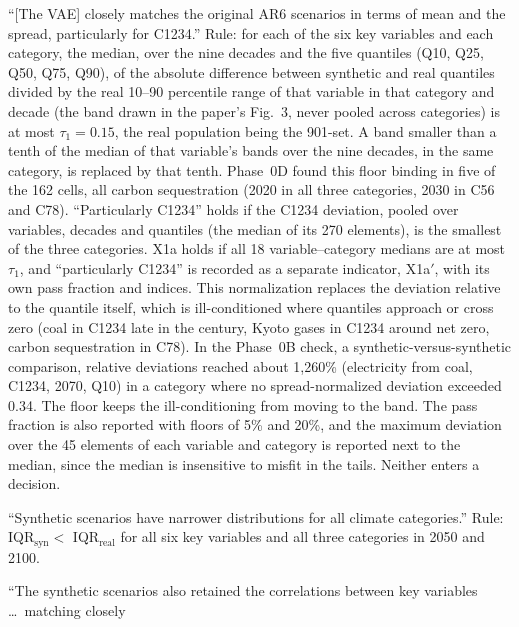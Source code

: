 \documentclass[11pt,a4paper]{article}
\newcommand{\claim}[1]{\textbf{#1}}
\begin{document}
\begin{description}[style=nextline]
\item[\claim{X1a} (distributional match).] ``[The VAE] closely matches the
  original AR6 scenarios in terms of mean and the spread, particularly for
  C1234.'' Rule: for each of the six key variables and each category, the
  median, over the nine decades and the five quantiles (Q10, Q25, Q50, Q75,
  Q90), of the absolute difference between synthetic and real quantiles
  divided by the real 10--90 percentile range of that variable in
  that category and decade (the band drawn in the paper's Fig.~3,
  never pooled across categories) is at most $\tau_{1}=0.15$, the real
  population being the 901-set. A band smaller than a tenth of the
  median of that variable's bands over the nine decades, in the same
  category, is replaced by that tenth. Phase~0D found this floor binding
  in five of the 162 cells, all carbon sequestration (2020 in all three
  categories, 2030 in C56 and C78). ``Particularly C1234'' holds if the
  C1234 deviation, pooled over variables, decades and quantiles (the
  median of its 270 elements), is the smallest of the three categories.
  X1a holds if all 18 variable--category medians are at most
  $\tau_1$, and ``particularly C1234'' is recorded as a separate indicator,
  X1a$'$, with its own pass fraction and indices. This normalization replaces the
  deviation relative to the quantile itself, which is ill-conditioned where
  quantiles approach or cross zero (coal in C1234 late in the century,
  Kyoto gases in C1234 around net zero, carbon sequestration in C78). In
  the Phase~0B check, a synthetic-versus-synthetic comparison, relative
  deviations reached about 1{,}260\% (electricity from coal, C1234, 2070,
  Q10) in a category where no spread-normalized deviation exceeded 0.34.
  The floor keeps the ill-conditioning from moving to the band. The
  pass fraction is also reported with floors of 5\% and 20\%, and the
  maximum deviation over the 45 elements of each variable and category is
  reported next to the median, since the median is insensitive to misfit
  in the tails. Neither enters a decision.
\item[\claim{X1b} (narrower distributions).] ``Synthetic scenarios have
  narrower distributions for all climate categories.'' Rule:
  IQR$_{\mathrm{syn}} <$ IQR$_{\mathrm{real}}$ for all six key variables and
  all three categories in 2050 and 2100.
\item[\claim{X2} (correlation replication).] ``The synthetic scenarios also
  retained the correlations between key variables \dots\ matching closely

\end{description}
\end{document}
